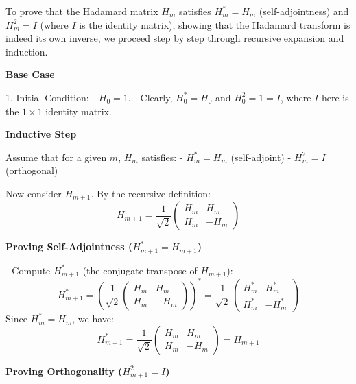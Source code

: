\documentclass[8pt]{article}
\begin{document}
{To prove that the Hadamard matrix \(H_m\) satisfies \(H_m^* = H_m\) (self-adjointness) and \(H_m^2 = I\) (where \(I\) is the identity matrix), showing that the Hadamard transform is indeed its own inverse, we proceed step by step through recursive expansion and induction.

\textbf{Base Case}

1. Initial Condition: 
   - \(H_0 = 1\). 
   - Clearly, \(H_0^* = H_0\) and \(H_0^2 = 1 = I\), where \(I\) here is the \(1 \times 1\) identity matrix.

\textbf{Inductive Step}

Assume that for a given \(m\), \(H_m\) satisfies:
- \(H_m^* = H_m\) (self-adjoint)
- \(H_m^2 = I\) (orthogonal)

Now consider \(H_{m+1}\). By the recursive definition:
\[
H_{m+1} = \frac{1}{\sqrt{2}} \begin{pmatrix} H_m & H_m \\ H_m & -H_m \end{pmatrix}
\]

\textbf{Proving Self-Adjointness (\(H_{m+1}^* = H_{m+1}\))}

- Compute \(H_{m+1}^*\) (the conjugate transpose of \(H_{m+1}\)):
  \[
  H_{m+1}^* = \left(\frac{1}{\sqrt{2}} \begin{pmatrix} H_m & H_m \\ H_m & -H_m \end{pmatrix}\right)^* = \frac{1}{\sqrt{2}} \begin{pmatrix} H_m^* & H_m^* \\ H_m^* & -H_m^* \end{pmatrix}
  \]
  Since \(H_m^* = H_m\), we have:
  \[
  H_{m+1}^* = \frac{1}{\sqrt{2}} \begin{pmatrix} H_m & H_m \\ H_m & -H_m \end{pmatrix} = H_{m+1}
  \]

\textbf{Proving Orthogonality (\(H_{m+1}^2 = I\))}

}
\end{document}
